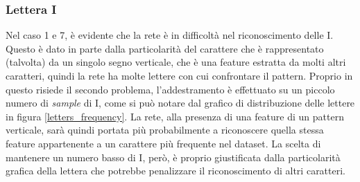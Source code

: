 \documentclass[a4paper,12pt]{article}
\begin{document}
\subsubsection{Lettera I}
Nel caso 1 e 7, è evidente che la rete è in difficoltà nel riconoscimento delle I. Questo è dato in parte dalla particolarità del carattere che è rappresentato (talvolta) da un singolo segno verticale, che è una feature estratta da molti altri caratteri, quindi la rete ha molte lettere con cui confrontare il pattern. Proprio in questo risiede il secondo problema, l'addestramento è effettuato su un piccolo numero di \textit{sample} di I, come si può notare dal grafico di distribuzione delle lettere in figura \ref{letters_frequency}.
La rete, alla presenza di una feature di un pattern verticale, sarà quindi portata più probabilmente a riconoscere quella stessa feature appartenente a un carattere più frequente nel dataset. La scelta di mantenere un numero basso di I, però, è proprio giustificata dalla particolarità grafica della lettera che potrebbe penalizzare il riconoscimento di altri caratteri.
\end{document}
